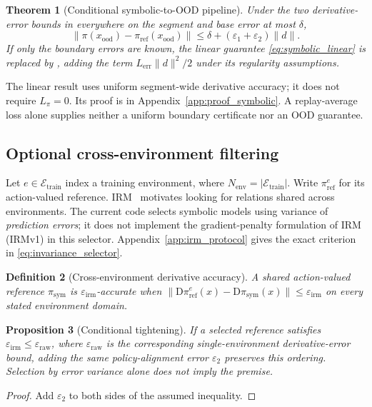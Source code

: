 \documentclass[10pt]{article}
\newtheorem{theorem}{Theorem}[section]
\newtheorem{definition}[theorem]{Definition}
\newtheorem{proposition}[theorem]{Proposition}
\begin{document}
\begin{theorem}[Conditional symbolic-to-OOD pipeline]
\label{thm:sindy_pipeline}
Under the two derivative-error bounds in  everywhere on the segment and base error at most $\delta$,
\begin{equation}
\|\pi(x_{\mathrm{ood}})-\pi_{\mathrm{ref}}(x_{\mathrm{ood}})\|
\leq\delta+(\varepsilon_1+\varepsilon_2)\|d\|.
\label{eq:symbolic_linear}
\end{equation}
If only the boundary errors are known, the linear guarantee \eqref{eq:symbolic_linear} is replaced by , adding the term $L_{\mathrm{err}}\|d\|^2/2$ under its regularity assumptions.
\end{theorem}
The linear result uses uniform segment-wide derivative accuracy; it does not require $L_\pi=0$. Its proof is in Appendix~\ref{app:proof_symbolic}. A replay-average loss alone supplies neither a uniform boundary certificate nor an OOD guarantee.

\subsection{Optional cross-environment filtering}
\label{sec:irm}

Let $e\in\mathcal{E}_{\mathrm{train}}$ index a training environment, where $N_{\mathrm{env}}=|\mathcal{E}_{\mathrm{train}}|$. Write $\pi_{\mathrm{ref}}^e$ for its action-valued reference. IRM~\cite{Arjovsky2019IRM} motivates looking for relations shared across environments. The current code selects symbolic models using variance of \emph{prediction errors}; it does not implement the gradient-penalty formulation of IRM (IRMv1) in this selector. Appendix~\ref{app:irm_protocol} gives the exact criterion in \eqref{eq:invariance_selector}.

\begin{definition}[Cross-environment derivative accuracy]
\label{def:irm}
A shared action-valued reference $\pi_{\mathrm{sym}}$ is
$\varepsilon_{\mathrm{irm}}$-accurate when
$\|\mathrm{D}\pi_{\mathrm{ref}}^e(x)-\mathrm{D}\pi_{\mathrm{sym}}(x)\|
\leq\varepsilon_{\mathrm{irm}}$ on every stated environment domain.
\end{definition}

\begin{proposition}[Conditional tightening]
\label{thm:irm_tighten}
If a selected reference satisfies
$\varepsilon_{\mathrm{irm}}\leq\varepsilon_{\mathrm{raw}}$,
where $\varepsilon_{\mathrm{raw}}$ is the corresponding single-environment derivative-error bound, adding the same policy-alignment error $\varepsilon_2$ preserves this ordering. Selection by error variance alone does not imply the premise.
\end{proposition}
\begin{proof}
Add $\varepsilon_2$ to both sides of the assumed inequality.
\end{proof}
\end{document}
